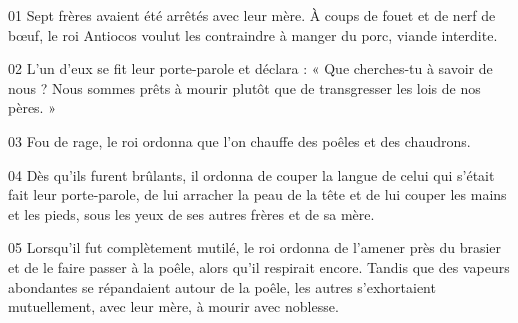 01 Sept frères avaient été arrêtés avec leur mère. À coups de fouet et de nerf de bœuf, le roi Antiocos voulut les contraindre à manger du porc, viande interdite.

02 L’un d’eux se fit leur porte-parole et déclara : « Que cherches-tu à savoir de nous ? Nous sommes prêts à mourir plutôt que de transgresser les lois de nos pères. »

03 Fou de rage, le roi ordonna que l’on chauffe des poêles et des chaudrons.

04 Dès qu’ils furent brûlants, il ordonna de couper la langue de celui qui s’était fait leur porte-parole, de lui arracher la peau de la tête et de lui couper les mains et les pieds, sous les yeux de ses autres frères et de sa mère.

05 Lorsqu’il fut complètement mutilé, le roi ordonna de l’amener près du brasier et de le faire passer à la poêle, alors qu’il respirait encore. Tandis que des vapeurs abondantes se répandaient autour de la poêle, les autres s’exhortaient mutuellement, avec leur mère, à mourir avec noblesse.